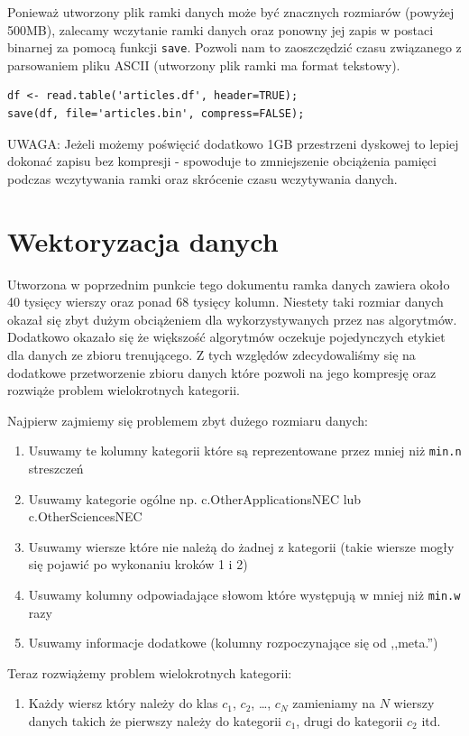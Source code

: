 \documentclass[a4paper,12pt]{article}
\begin{document}
		Ponieważ utworzony plik ramki danych może być znacznych rozmiarów
		(powyżej 500MB), zalecamy wczytanie ramki danych oraz ponowny 
		jej zapis w postaci binarnej za pomocą funkcji \texttt{save}.
		Pozwoli nam to zaoszczędzić czasu związanego z parsowaniem
		pliku ASCII (utworzony plik ramki ma format tekstowy).
		\begin{verbatim}
df <- read.table('articles.df', header=TRUE);
save(df, file='articles.bin', compress=FALSE);
		\end{verbatim}		
				
		\textsc{UWAGA}: Jeżeli możemy poświęcić dodatkowo 1GB przestrzeni
		dyskowej to lepiej dokonać zapisu bez kompresji - spowoduje to
		zmniejszenie obciążenia pamięci podczas wczytywania ramki oraz
		skrócenie czasu wczytywania danych.
	
\section{Wektoryzacja danych}
		Utworzona w poprzednim punkcie tego dokumentu ramka danych
		zawiera około 40 tysięcy wierszy oraz ponad 68 tysięcy kolumn.
		Niestety taki rozmiar danych okazał się zbyt dużym obciążeniem
		dla wykorzystywanych przez nas algorytmów. Dodatkowo okazało się
		że większość algorytmów oczekuje pojedynczych etykiet dla danych
		ze zbioru trenującego. Z tych względów zdecydowaliśmy się 
		na dodatkowe przetworzenie zbioru danych które pozwoli na jego
		kompresję oraz rozwiąże problem wielokrotnych kategorii.
		
		Najpierw zajmiemy się problemem zbyt dużego rozmiaru danych:
		\begin{enumerate}
			\item
				Usuwamy te kolumny kategorii które są reprezentowane
				przez mniej niż \texttt{min.n} streszczeń
			\item
				Usuwamy kategorie ogólne np. c.OtherApplicationsNEC lub
				c.OtherSciencesNEC
			\item
				Usuwamy wiersze które nie należą do żadnej z kategorii
				(takie wiersze mogły się pojawić po wykonaniu kroków 1 i 2)
			\item
				Usuwamy kolumny odpowiadające słowom które występują
				w mniej niż \texttt{min.w} razy
			\item
				Usuwamy informacje dodatkowe (kolumny rozpoczynające się
				od ,,meta.'')
		\end{enumerate}
		
		Teraz rozwiążemy problem wielokrotnych kategorii:
		\begin{enumerate}
			\item
				Każdy wiersz który należy do klas $c_1$, $c_2$, \ldots, $c_N$
				zamieniamy na $N$ wierszy danych takich że pierwszy należy
				do kategorii $c_1$, drugi do kategorii $c_2$ itd.
		\end{enumerate}
		
\end{document}
